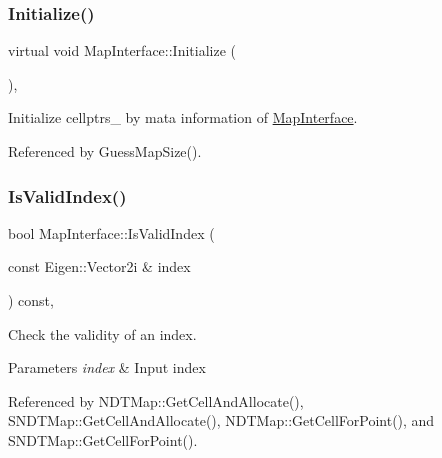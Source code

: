 \mbox{\label{classMapInterface_a0bb41a6f4ca6e146b7c8a0e99e888169}} 
\subsubsection{\texorpdfstring{Initialize()}{Initialize()}}
{\footnotesize\ttfamily virtual void Map\+Interface\+::\+Initialize (\begin{DoxyParamCaption}{ }\end{DoxyParamCaption})\hspace{0.3cm}{\ttfamily [protected]}, {}}



Initialize {\ttfamily cellptrs\+\_\+} by mata information of \hyperlink{classMapInterface}{Map\+Interface}. 



Referenced by Guess\+Map\+Size().

\mbox{\label{classMapInterface_a19f763b424405f5da2863660c5f0ccb3}} 
\subsubsection{\texorpdfstring{Is\+Valid\+Index()}{IsValidIndex()}}
{\footnotesize\ttfamily bool Map\+Interface\+::\+Is\+Valid\+Index (\begin{DoxyParamCaption}\item[{const Eigen\+::\+Vector2i \&}]{index }\end{DoxyParamCaption}) const\hspace{0.3cm}{\ttfamily [inline]}, {\ttfamily [protected]}}



Check the validity of an index. 


\begin{DoxyParams}{Parameters}
{\em index} & Input index \\
\hline
\end{DoxyParams}


Referenced by N\+D\+T\+Map\+::\+Get\+Cell\+And\+Allocate(), S\+N\+D\+T\+Map\+::\+Get\+Cell\+And\+Allocate(), N\+D\+T\+Map\+::\+Get\+Cell\+For\+Point(), and S\+N\+D\+T\+Map\+::\+Get\+Cell\+For\+Point().


